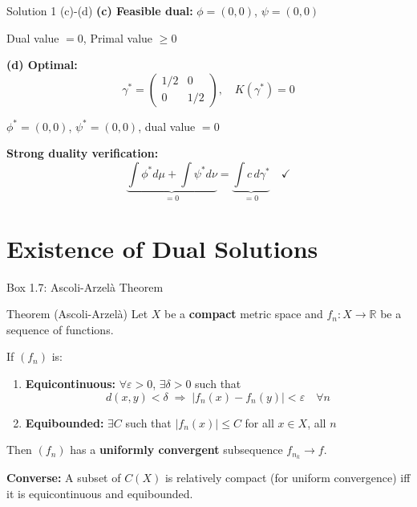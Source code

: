 \documentclass[aspectratio=169]{beamer}
\newcommand{\R}{\mathbb{R}}
\begin{document}
\begin{frame}{Solution 1 (c)-(d)}
\textbf{(c) Feasible dual:} $\phi = (0,0)$, $\psi = (0,0)$

\quad Dual value $= 0$, Primal value $\geq 0$ \checkmark

\vspace{0.3cm}
\textbf{(d) Optimal:}
\[
\gamma^* = \begin{pmatrix} 1/2 & 0 \\ 0 & 1/2 \end{pmatrix}, \quad K(\gamma^*) = 0
\]

$\phi^* = (0,0)$, $\psi^* = (0,0)$, dual value $= 0$

\vspace{0.3cm}
\textbf{Strong duality verification:}
\[
\underbrace{\int \phi^* d\mu + \int \psi^* d\nu}_{= 0} = \underbrace{\int c \, d\gamma^*}_{= 0} \quad \checkmark
\]
\end{frame}

\section{Existence of Dual Solutions}

\begin{frame}{Box 1.7: Ascoli-Arzel\`a Theorem}
\begin{block}{Theorem (Ascoli-Arzel\`a)}
Let $X$ be a \textbf{compact} metric space and $f_n: X \to \R$ be a sequence of functions.

If $(f_n)$ is:
\begin{enumerate}
    \item \textbf{Equicontinuous:} $\forall \varepsilon > 0$, $\exists \delta > 0$ such that
    \[
    d(x,y) < \delta \;\Rightarrow\; |f_n(x) - f_n(y)| < \varepsilon \quad \forall n
    \]
    \item \textbf{Equibounded:} $\exists C$ such that $|f_n(x)| \leq C$ for all $x \in X$, all $n$
\end{enumerate}

Then $(f_n)$ has a \textbf{uniformly convergent} subsequence $f_{n_k} \to f$.
\end{block}

\vspace{0.2cm}
\textbf{Converse:} A subset of $C(X)$ is relatively compact (for uniform convergence) iff it is equicontinuous and equibounded.
\end{frame}
\end{document}
